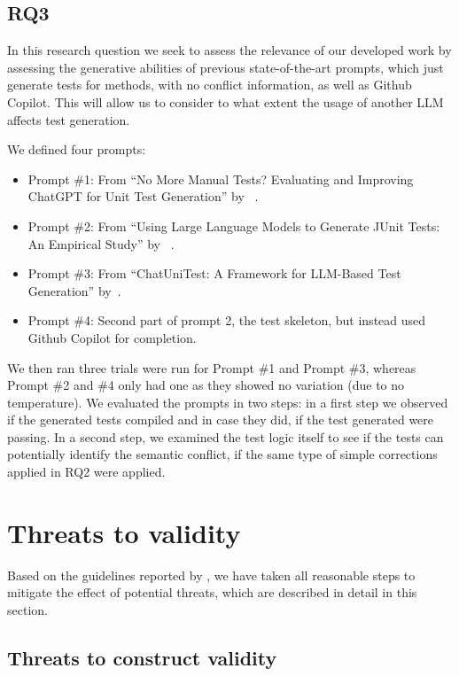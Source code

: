 \subsection{RQ3}

In this research question we seek to assess the relevance of our developed work by assessing the generative abilities of previous state-of-the-art prompts, which just generate tests for methods, with no conflict information, as well as Github Copilot. This will allow us to consider to what extent the usage of another LLM affects test generation.

We defined four prompts:
\begin{itemize}
  \item Prompt \#1: From ``No More Manual Tests? Evaluating and Improving ChatGPT for Unit Test Generation'' by ~\citet{kn:chattester}.
  \item Prompt \#2: From ``Using Large Language Models to Generate JUnit Tests: An Empirical Study'' by ~\citet{kn:siddiq2023empirical}.
  \item Prompt \#3: From ``ChatUniTest: A Framework for LLM-Based Test Generation'' by~\citet{kn:chatunitest}.
  \item Prompt \#4: Second part of prompt 2, the test skeleton, but instead used Github Copilot for completion.
\end{itemize}
%
We then ran three trials were run for Prompt \#1 and Prompt \#3, whereas Prompt \#2 and \#4 only had one as they showed no variation (due to no temperature).
We evaluated the prompts in two steps: in a first step we observed if the generated tests compiled and in case they did, if the test generated were passing.
In a second step, we examined the test logic itself to see if the tests can potentially identify the semantic conflict, if the same type of simple corrections applied in RQ2 were applied.

\section{Threats to validity}

Based on the guidelines reported by \citet{wohlin2012experimentation}, we have
taken all reasonable steps to mitigate the effect of potential threats, which
are described in detail in this section.

\subsection{Threats to construct validity}

